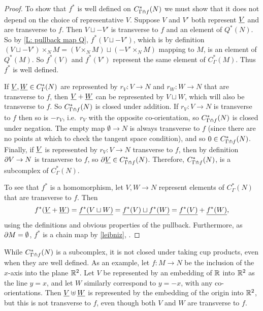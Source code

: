 \begin{proof}
	To show that $f^*$ is well defined on $C^*_{\Gamma \pitchfork f}(N)$ we must show that it does not depend on the choice of representative $V$.
	Suppose $V$ and $V'$ both represent $\underline{V}$ and are transverse to $f$.
	Then $V \sqcup -V'$ is transverse to $f$ and an element of $Q^*(N)$.
	So by \cref{L: pullback map Q}, $f^*(V \sqcup -V')$, which is by definition $(V \sqcup -V') \times_N M = (V \times_N M) \sqcup (-V' \times_N M)$ mapping to $M$, is an element of $Q^*(M)$.
	So $f^*(V)$ and $f^*(V')$ represent the same element of $C^*_{\Gamma}(M)$.
	Thus $f^*$ is well defined.

	If $\underline{V},\underline{W} \in C^*_\Gamma(N)$ are represented by $r_V \colon V \to N$ and $r_W \colon W \to N$ that are transverse to $f$, then $\underline{V}+\underline{W}$ can be represented by $V \sqcup W$, which will also be transverse to $f$.
	So $C^*_{\Gamma \pitchfork f}(N)$ is closed under addition.
	If $r_V \colon V \to N$ is transverse to $f$ then so is $-r_V$, i.e.\ $r_V$ with the opposite co-orientation, so $C^*_{\Gamma \pitchfork f}(N)$ is closed under negation.
	The empty map $\emptyset \to N$ is always transverse to $f$ (since there are no points at which to check the tangent space condition), and so $0 \in C^*_{\Gamma \pitchfork f}(N)$.
	Finally, if $\underline{V}$ is represented by $r_V \colon V \to N$ transverse to $f$, then by definition $\partial V \to N$ is transverse to $f$, so $\partial \underline{V} \in C^*_{\Gamma \pitchfork f}(N)$.
	Therefore, $C^*_{\Gamma \pitchfork f}(N)$, is a subcomplex of $C^*_{\Gamma}(N)$.

	To see that $f^*$ is a homomorphism, let $V,W \to N$ represent elements of $C^*_{\Gamma}(N)$ that are transverse to $f$.
	Then
	$$f^*(\underline{V}+\underline{W}) = \underline{f^*(V \sqcup W)} = \underline{f^*(V) \sqcup f^*(W)} = \underline{f^*(V)}+\underline{f^*(W)},$$
	using the definitions and obvious properties of the pullback.
	Furthermore, as $\partial M = \emptyset$, $f^*$ is a chain map by \cref{leibniz}, .
\end{proof}

\begin{remark}
	While $C^*_{\Gamma \pitchfork f}(N)$ is a subcomplex, it is not closed under taking cup products, even when they are well defined.
	As an example, let $f \colon M \to N$ be the inclusion of the $x$-axis into the plane $\mathbb{R}^2$.
	Let $V$ be represented by an embedding of $\mathbb{R}$ into $\mathbb{R}^2$ as the line $y = x$, and let $W$ similarly correspond to $y = -x$, with any co-orientations.
	Then $\underline{V} \uplus \underline{W}$ is represented by the embedding of the origin into $\mathbb{R}^2$, but this is not transverse to $f$, even though both $V$ and $W$ are transverse to $f$.
\end{remark}

